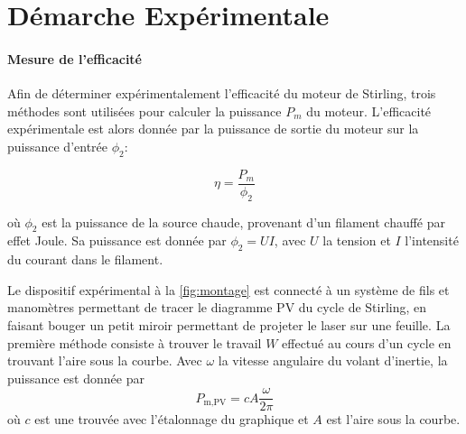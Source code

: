 \section{Démarche Expérimentale}

\paragraph{Mesure de l'efficacité}
Afin de déterminer expérimentalement l'efficacité du moteur de Stirling, trois méthodes sont utilisées pour calculer la puissance \(P_m\) du moteur. L'efficacité expérimentale est alors donnée par la puissance de sortie du moteur sur la puissance d'entrée \(\phi_2\):

\begin{equation}
    \eta = \frac{P_m}{\phi_2}
    \label{eq:efficacite}
\end{equation}

où \(\phi_2\) est la puissance de la source chaude, provenant d'un filament chauffé par effet Joule. Sa puissance est donnée par \(\phi_2 = UI\), avec \(U\) la tension et \(I\) l'intensité du courant dans le filament.

Le dispositif expérimental à la \autoref{fig:montage} est connecté à un système de fils et manomètres permettant de tracer le diagramme PV du cycle de Stirling, en faisant bouger un petit miroir permettant de projeter le laser sur une feuille. La première méthode consiste à trouver le travail \(W\) effectué au cours d'un cycle en trouvant l'aire sous la courbe. Avec \(\omega\) la vitesse angulaire du volant d'inertie, la puissance est donnée par 
\begin{equation}
    P_\textrm{m,PV} = c A \frac{\omega}{2 \pi}
    \label{eq:pm_pv}
\end{equation}
où \(c\) est une trouvée avec l'étalonnage du graphique et \(A\) est l'aire sous la courbe.

